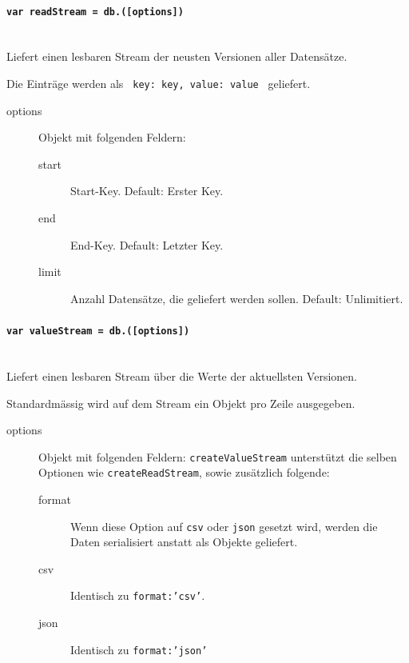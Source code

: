 
\paragraph{\texttt{var readStream = db.([options])}} ~\\
Liefert einen lesbaren Stream der neusten Versionen aller Datensätze.

Die Einträge werden als \texttt{ {key: key, value: value} } geliefert.

\begin{description}
\item[options] Objekt mit folgenden Feldern:
    \begin{description}
    \item[start] Start-Key. Default: Erster Key.
    \item[end] End-Key. Default: Letzter Key.
    \item[limit] Anzahl Datensätze, die geliefert werden sollen. Default: Unlimitiert.
    \end{description}
\end{description}


\paragraph{\texttt{var valueStream = db.([options])}} ~\\
Liefert einen lesbaren Stream über die Werte der aktuellsten Versionen. 

Standardmässig wird auf dem Stream ein Objekt pro Zeile ausgegeben.

\begin{description}
\item[options] Objekt mit folgenden Feldern:
    \texttt{createValueStream} unterstützt die selben Optionen wie \texttt{createReadStream}, sowie zusätzlich folgende:
    \begin{description}
    \item[format] Wenn diese Option auf \texttt{csv} oder \texttt{json} gesetzt wird, werden die Daten serialisiert anstatt als Objekte geliefert.
    \item[csv] Identisch zu \texttt{format:'csv'}.
    \item[json] Identisch zu \texttt{format:'json'}
    \end{description}
\end{description}

